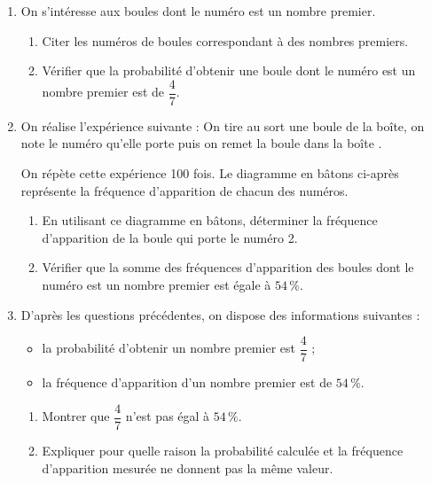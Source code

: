 \documentclass[12pt,a4paper,french]{article}
\begin{document}
\begin{enumerate}
	\item On s'intéresse aux boules dont le numéro est un nombre premier.
	\begin{enumerate}
		\item Citer les numéros de boules correspondant à des nombres premiers.
		\item Vérifier que la probabilité d'obtenir une boule dont le numéro est un nombre premier est de $\dfrac{4}{7}$.
	\end{enumerate}
	\item On réalise l'expérience suivante : \og On tire au sort une boule de la boîte, on note le numéro qu'elle porte puis on remet la boule dans la boîte \fg.
	
	On répète cette expérience 100 fois. Le diagramme en bâtons ci-après représente la fréquence d'apparition de chacun des numéros.

\begin{center}
	\end{center}

	\begin{enumerate}
		\item En utilisant ce diagramme en bâtons, déterminer la fréquence d'apparition de la boule qui porte le numéro 2.
		\item Vérifier que la somme des fréquences d'apparition des boules dont le numéro est un nombre premier est égale à $54\,\%$.
	\end{enumerate}
	\item D'après les questions précédentes, on dispose des informations suivantes :
	\begin{itemize}
		\item la probabilité d'obtenir un nombre premier est $\dfrac{4}{7}$ ;
		\item la fréquence d'apparition d'un nombre premier est de $54\,\%$.
	\end{itemize}
	\begin{enumerate}
		\item Montrer que $\dfrac{4}{7}$ n'est pas égal à $54\,\%$.
		\item Expliquer pour quelle raison la probabilité calculée et la fréquence d'apparition mesurée ne donnent pas la même valeur.
	\end{enumerate}
\end{enumerate}
\end{document}
